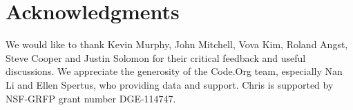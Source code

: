 \section*{Acknowledgments} 
We would like to thank Kevin Murphy, John Mitchell, Vova Kim, Roland Angst, Steve Cooper and Justin Solomon for their critical feedback and useful discussions. We appreciate the generosity of the Code.Org team, especially Nan Li and Ellen Spertus, who providing data and support. Chris is supported by NSF-GRFP grant number DGE-114747.
